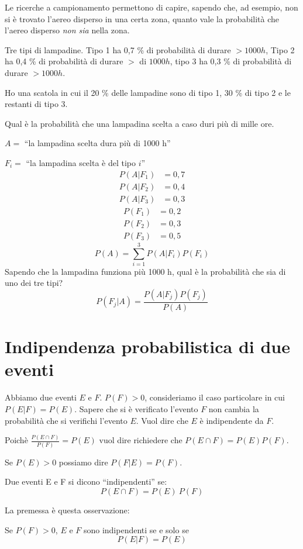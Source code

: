 Le ricerche a campionamento permettono di capire, sapendo che, ad esempio, non si \`e trovato l'aereo disperso in una certa zona, quanto vale la probabilit\`a che l'aereo disperso \emph{non sia} nella zona.

\begin{exmp}
Tre tipi di lampadine. Tipo 1 ha 0,7 \% di probabilit\`a di durare $> 1000 h$, Tipo 2 ha 0,4 \% di probabilit\`a di durare $>$ di $1000 h$, tipo 3 ha 0,3 \% di probabilit\`a di durare $> 1000 h$.

Ho una scatola in cui il 20 \% delle lampadine sono di tipo 1, 30 \% di tipo 2 e le restanti di tipo 3.

Qual \`e la probabilit\`a che una lampadina scelta a caso duri pi\`u di mille ore.

$A =$ ``la lampadina scelta dura pi\`u di 1000 h''

$F_i =$ ``la lampadina scelta \`e del tipo $i$''
\begin{align*}
P(A | F_1) &= 0{,}7 \\
P(A | F_2) &= 0{,}4 \\
P(A | F_3) &= 0{,}3
\end{align*}
\begin{align*}
P(F_1) &= 0{,}2 \\
P(F_2) &= 0{,}3 \\
P(F_3) &= 0{,}5
\end{align*}
\[
P(A) = \sum_{i = 1}^{3} P(A | F_i) P(F_i)
\]
Sapendo che la lampadina funziona pi\`u 1000 h, qual \`e la probabilit\`a che sia di uno dei tre tipi?
\[
P(F_j | A) = \frac{P(A | F_j) P(F_j)}{P(A)}
\]
\end{exmp}

\section{Indipendenza probabilistica di due eventi}

Abbiamo due eventi $E$ e $F$. $P(F) > 0$, consideriamo il caso particolare in cui $P(E | F) = P(E)$. Sapere che si \`e verificato l'evento $F$ non cambia la probabilit\`a che si verifichi l'evento $E$. Vuol dire che $E$ \`e indipendente da $F$.

Poich\`e $\frac{P(E \cap F)}{P(F)} = P(E)$ vuol dire richiedere che $P(E \cap F) = P(E) P(F)$.

Se $P(E) > 0$ possiamo dire $P(F | E) = P(F)$.

\begin{defn}
Due eventi E e F si dicono ``indipendenti'' se:
\[
P(E \cap F) = P(E) \ P(F)
\]
\end{defn}
La premessa \`e questa osservazione:
\begin{oss}
Se $P(F) > 0$, $E$ e $F$ sono indipendenti se e solo se
\[
P(E| F) = P(E)
\]
\end{oss}

